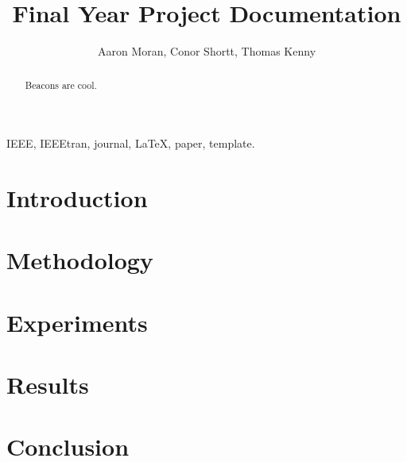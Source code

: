 \documentclass[journal]{IEEEtran}
\begin{document}
\title{Final Year Project Documentation}

\author{Aaron Moran, Conor Shortt, Thomas Kenny}
\date{}

\maketitle


\begin{abstract}
	Beacons are cool.
\end{abstract}

\begin{IEEEkeywords}
IEEE, IEEEtran, journal, \LaTeX, paper, template.
\end{IEEEkeywords}


\section{Introduction}

\section{Methodology}

\section{Experiments}

\section{Results}

\section{Conclusion}

\end{document}
